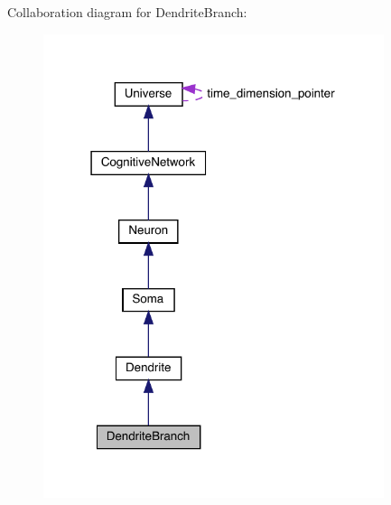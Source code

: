 Collaboration diagram for Dendrite\+Branch\+:
\nopagebreak
\begin{figure}[H]
\begin{center}
\leavevmode
\includegraphics[width=283pt]{class_dendrite_branch__coll__graph}
\end{center}
\end{figure}
